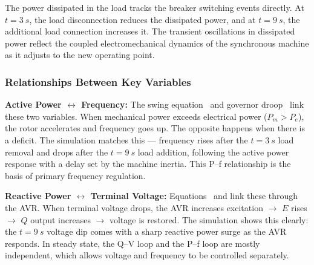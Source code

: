 The power dissipated in the load tracks the breaker switching events directly.
At $t=\SI{3}{s}$, the load disconnection reduces the dissipated power, and at
$t=\SI{9}{s}$, the additional load connection increases it. The transient
oscillations in dissipated power reflect the coupled electromechanical dynamics
of the synchronous machine as it adjusts to the new operating point.

\subsubsection{Relationships Between Key Variables}

\textbf{Active Power $\leftrightarrow$ Frequency:}
The swing equation~ and governor droop~
link these two variables. When mechanical power exceeds electrical power
($P_m > P_e$), the rotor accelerates and frequency goes up. The opposite
happens when there is a deficit. The simulation matches this --- frequency rises
after the $t=\SI{3}{s}$ load removal and drops after the $t=\SI{9}{s}$ load
addition, following the active power response with a delay set by the machine
inertia. This P--f relationship is the basis of primary frequency regulation.

\textbf{Reactive Power $\leftrightarrow$ Terminal Voltage:}
Equations~ and  link these through
the AVR. When terminal voltage drops, the AVR increases excitation
$\rightarrow$ $E$ rises $\rightarrow$ $Q$ output increases
$\rightarrow$ voltage is restored. The simulation shows this clearly: the
$t=\SI{9}{s}$ voltage dip comes with a sharp reactive power surge as the AVR
responds. In steady state, the Q--V loop and the P--f loop are mostly
independent, which allows voltage and frequency to be controlled separately.
